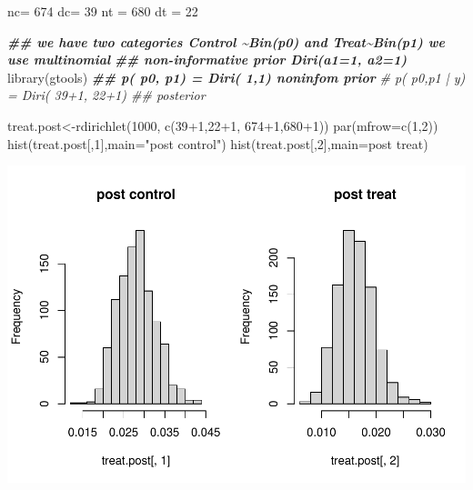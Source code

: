 \documentclass[
]{book}
\newenvironment{Shaded}{\begin{snugshade}}{\end{snugshade}}
\newcommand{\AttributeTok}[1]{\textcolor[rgb]{0.77,0.63,0.00}{#1}}
\newcommand{\CommentTok}[1]{\textcolor[rgb]{0.56,0.35,0.01}{\textit{#1}}}
\newcommand{\DecValTok}[1]{\textcolor[rgb]{0.00,0.00,0.81}{#1}}
\newcommand{\DocumentationTok}[1]{\textcolor[rgb]{0.56,0.35,0.01}{\textbf{\textit{#1}}}}
\newcommand{\FunctionTok}[1]{\textcolor[rgb]{0.00,0.00,0.00}{#1}}
\newcommand{\NormalTok}[1]{#1}
\newcommand{\OtherTok}[1]{\textcolor[rgb]{0.56,0.35,0.01}{#1}}
\newcommand{\SpecialCharTok}[1]{\textcolor[rgb]{0.00,0.00,0.00}{#1}}
\newcommand{\StringTok}[1]{\textcolor[rgb]{0.31,0.60,0.02}{#1}}
\theoremstyle{definition}
\theoremstyle{definition}
\theoremstyle{definition}
\theoremstyle{definition}
\theoremstyle{remark}
\begin{document}
\begin{Shaded}
\begin{Highlighting}[]
\NormalTok{ nc}\OtherTok{=} \DecValTok{674}
\NormalTok{ dc}\OtherTok{=} \DecValTok{39}
\NormalTok{ nt }\OtherTok{=} \DecValTok{680}
\NormalTok{ dt }\OtherTok{=} \DecValTok{22}

 
 
 \DocumentationTok{\#\# we have two categories Control \textasciitilde{}Bin(p0) and Treat\textasciitilde{}Bin(p1) we use multinomial}
 \DocumentationTok{\#\# non{-}informative prior Diri(a1=1, a2=1)}
 \FunctionTok{library}\NormalTok{(gtools)}
  \DocumentationTok{\#\# p( p0, p1) = Diri( 1,1) noninfom prior}
  \CommentTok{\# p( p0,p1 | y) = Diri(  39+1, 22+1) \#\#  posterior}
 
\NormalTok{ treat.post}\OtherTok{\textless{}{-}}\FunctionTok{rdirichlet}\NormalTok{(}\DecValTok{1000}\NormalTok{, }\FunctionTok{c}\NormalTok{(}\DecValTok{39}\SpecialCharTok{+}\DecValTok{1}\NormalTok{,}\DecValTok{22}\SpecialCharTok{+}\DecValTok{1}\NormalTok{, }\DecValTok{674}\SpecialCharTok{+}\DecValTok{1}\NormalTok{,}\DecValTok{680}\SpecialCharTok{+}\DecValTok{1}\NormalTok{))}
 \FunctionTok{par}\NormalTok{(}\AttributeTok{mfrow=}\FunctionTok{c}\NormalTok{(}\DecValTok{1}\NormalTok{,}\DecValTok{2}\NormalTok{))}
  \FunctionTok{hist}\NormalTok{(treat.post[,}\DecValTok{1}\NormalTok{],}\AttributeTok{main=}\StringTok{"post control"}\NormalTok{)}
  \FunctionTok{hist}\NormalTok{(treat.post[,}\DecValTok{2}\NormalTok{],}\AttributeTok{main=}\StringTok{\textquotesingle{}post treat\textquotesingle{}}\NormalTok{)}
\end{Highlighting}
\end{Shaded}

\includegraphics{_main_files/figure-latex/unnamed-chunk-36-1.pdf}
\end{document}
